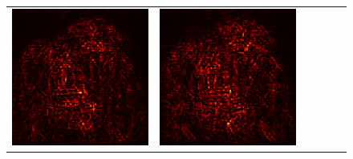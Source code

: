 \documentclass[preprint,12pt]{elsarticle}
\begin{document}
\begin{figure}[p]
\begin{tabular}{cccccc}
  \includegraphics[scale=\scale]{../visualizations/examples/imagenette/resnet18/positive_saliency_map/8.png} & 
  \includegraphics[scale=\scale]{../visualizations/examples/imagenette/resnet18/negative_saliency_map/8.png} & 

\end{tabular}
\end{figure}
\end{document}
